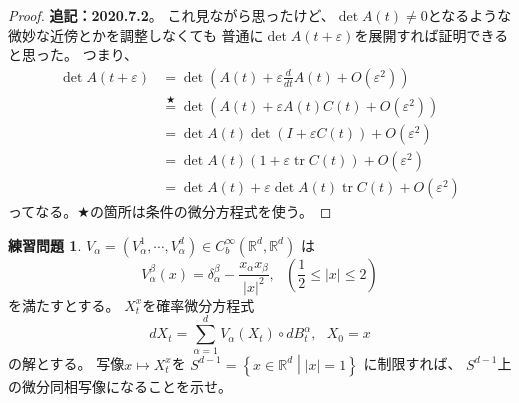 \documentclass[uplatex]{jsarticle}
\theoremstyle{definition}
\newtheorem{prob}[prob]{練習問題}
\def\ep{\varepsilon}
\DeclareMathOperator{\tr}{\mathrm{tr}}
\def\R{\mathbb{R}}
\begin{document}
\begin{proof}
  \textbf{追記：2020.7.2}。
  これ見ながら思ったけど、\(\det A(t) \neq 0\)となるような微妙な近傍とかを調整しなくても
  普通に\(\det A(t+\ep)\)を展開すれば証明できると思った。
  つまり、
  \begin{align*}
    \det A(t+\ep)
    &= \det\left( A(t) + \ep \frac{d}{dt}A(t) + O(\ep^2) \right) \\
    &\overset{\bigstar}{=} \det\left( A(t) + \ep A(t)C(t) + O(\ep^2) \right) \\
    &= \det A(t) \det \left( I + \ep C(t)\right) + O(\ep^2) \\
    &= \det A(t) \left( 1 + \ep \tr C(t) \right) + O(\ep^2) \\
    &= \det A(t) + \ep \det A(t) \tr C(t) + O(\ep^2)
  \end{align*}
  ってなる。\(\bigstar\)の箇所は条件の微分方程式を使う。
\end{proof}
















\begin{prob}\label{prob: 5.7}
  \(V_\alpha = (V_\alpha^1,\cdots,V_\alpha^d)\in C_b^\infty(\R^d,\R^d)\)
  は
  \[
  V_\alpha^\beta(x) = \delta_{\alpha}^\beta - \frac{x_\alpha x_\beta}{|x|^2}
  , \ \ \ \left( \frac{1}{2}\leq |x| \leq 2\right)
  \]
  を満たすとする。
  \(X_t^x\)を確率微分方程式
  \[
  dX_t = \sum_{\alpha=1}^d V_\alpha(X_t)\circ dB_t^\alpha,
  \ \ \ X_0 = x
  \]
  の解とする。
  写像\(x\mapsto X_t^x\)を
  \(S^{d-1} = \left\{ x\in \R^d \middle| |x| = 1\right\}\)
  に制限すれば、
  \(S^{d-1}\)上の微分同相写像になることを示せ。
\end{prob}
\end{document}
